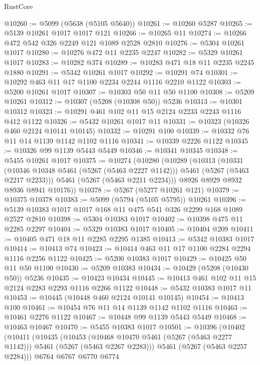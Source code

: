 \begin{lexlean}{RustCore}
\begin{coremodule}
@10260 := @5099 (@5638 (@5105 @5640))
@10261 := @10260 @5287
@10265 := @5139 @10261 @1017 @1017 @121
@10266 := @10265 @11
@10274 := @10266 @472 @542 @326 @2249 @121 @1089 @2528 @2810
@10276 := @5304 @10261 @1017
@10280 := @10276 @472 @11 @2235 @2247
@10282 := @5329 @10261 @1017
@10283 := @10282 @374
@10289 := @10283 @471 @18 @11 @2235 @2245 @1880
@10291 := @5342 @10261 @1017
@10292 := @10291 @74
@10301 := @10292 @463 @11 @17 @1100 @2234 @2244 @1116 @2210 @1122
@10303 := @5200 @10261 @1017
@10307 := @10303 @50 @11 @50 @1100
@10308 := @5209 @10261
@10312 := @10307 (@5208 (@10308 @50)) @5236
@10313 := @10301 @10312
@10323 := @10291 @461 @102 @11 @15 @2124 @2233 @2243 @1116 @412 @1122
@10326 := @5432 @10261 @1017 @11
@10331 := @10323 (@10326 @460 @2124 @10141 @10145)
@10332 := @10291 @100
@10339 := @10332 @76 @11 @14 @1139 @1142 @1102 @1116
@10341 := @10339 @2226 @1122
@10345 := @10326 @99 @1139 @5443 @5449
@10346 := @10341 @10345
@10348 := @5455 @10261 @1017
@10375 := @10274
    (@10280
      (@10289
        (@10313
          (@10331
            (@10346 @10348 @5461 (@5267 (@5463 @2227 @1142)))
            @5461
            (@5267 (@5463 @2217 @2233)))
          @5461
          (@5267 (@5463 @2211 @2234)))
        @8926
        @8929
        @8932
        @8936
        @8941
        @10176))
@10378 := @5267 (@5277 @10261 @121)
@10379 := @10375 @10378
@10383 := @5099 (@5794 (@5105 @5795)) @10261
@10396 := @5139 @10383 @1017 @1017 @168 @11 @475 @541 @326 @2299 @168 @1089 @2527 @2810
@10398 := @5304 @10383 @1017
@10402 := @10398 @475 @11 @2285 @2297
@10404 := @5329 @10383 @1017
@10405 := @10404 @209
@10411 := @10405 @471 @18 @11 @2285 @2295 @1385
@10413 := @5342 @10383 @1017
@10414 := @10413 @74
@10423 := @10414 @463 @11 @17 @1100 @2284 @2294 @1116 @2256 @1122
@10425 := @5200 @10383 @1017
@10429 := @10425 @50 @11 @50 @1100
@10430 := @5209 @10383
@10434 := @10429 (@5208 (@10430 @50)) @5236
@10435 := @10423 @10434
@10445 := @10413 @461 @102 @11 @15 @2124 @2283 @2293 @1116 @2266 @1122
@10448 := @5432 @10383 @1017 @11
@10453 := @10445 (@10448 @460 @2124 @10141 @10145)
@10454 := @10413 @100
@10461 := @10454 @76 @11 @14 @1139 @1142 @1102 @1116
@10463 := @10461 @2276 @1122
@10467 := @10448 @99 @1139 @5443 @5449
@10468 := @10463 @10467
@10470 := @5455 @10383 @1017
@10501 := @10396
    (@10402
      (@10411
        (@10435
          (@10453
            (@10468 @10470 @5461 (@5267 (@5463 @2277 @1142)))
            @5461
            (@5267 (@5463 @2267 @2283)))
          @5461
          (@5267 (@5463 @2257 @2284)))
        @6764
        @6767
        @6770
        @6774

\end{coremodule}
\end{lexlean}
